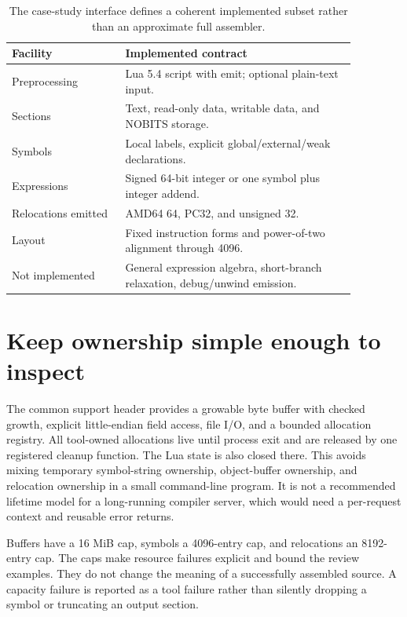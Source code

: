\begin{table}[htbp]
\caption{The case-study interface defines a coherent implemented subset rather than an approximate full assembler.}
\label{tab:ch56-contract}
\centering
\begin{tabular}{p{0.29\linewidth}p{0.58\linewidth}}
\toprule
Facility & Implemented contract \\
\midrule
Preprocessing & Lua 5.4 script with emit; optional plain-text input. \\
Sections & Text, read-only data, writable data, and NOBITS storage. \\
Symbols & Local labels, explicit global/external/weak declarations. \\
Expressions & Signed 64-bit integer or one symbol plus integer addend. \\
Relocations emitted & AMD64 64, PC32, and unsigned 32. \\
Layout & Fixed instruction forms and power-of-two alignment through 4096. \\
Not implemented & General expression algebra, short-branch relaxation, debug/unwind emission. \\
\bottomrule
\end{tabular}
\end{table}

\section{Keep ownership simple enough to inspect}
\label{sec:ch56-storage}

The common support header provides a growable byte buffer with checked growth, explicit little-endian field access, file I/O, and a bounded allocation registry.
All tool-owned allocations live until process exit and are released by one registered cleanup function.
The Lua state is also closed there.
This avoids mixing temporary symbol-string ownership, object-buffer ownership, and relocation ownership in a small command-line program.
It is not a recommended lifetime model for a long-running compiler server, which would need a per-request context and reusable error returns.

Buffers have a 16 MiB cap, symbols a 4096-entry cap, and relocations an 8192-entry cap.
The caps make resource failures explicit and bound the review examples.
They do not change the meaning of a successfully assembled source.
A capacity failure is reported as a tool failure rather than silently dropping a symbol or truncating an output section.

